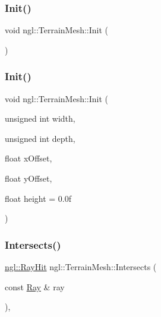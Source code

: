 \mbox{\label{classngl_1_1_terrain_mesh_adcbd87afe29c47b1d1edf5e893dfb95d}} 
\subsubsection{\texorpdfstring{Init()}{Init()}\hspace{0.1cm}{\footnotesize\ttfamily [1/2]}}
{\footnotesize\ttfamily void ngl\+::\+Terrain\+Mesh\+::\+Init (\begin{DoxyParamCaption}{ }\end{DoxyParamCaption})}

\mbox{\label{classngl_1_1_terrain_mesh_a23945d3a6905069b02b95684ef965447}} 
\subsubsection{\texorpdfstring{Init()}{Init()}\hspace{0.1cm}{\footnotesize\ttfamily [2/2]}}
{\footnotesize\ttfamily void ngl\+::\+Terrain\+Mesh\+::\+Init (\begin{DoxyParamCaption}\item[{unsigned int}]{width,  }\item[{unsigned int}]{depth,  }\item[{float}]{x\+Offset,  }\item[{float}]{y\+Offset,  }\item[{float}]{height = {\ttfamily 0.0f} }\end{DoxyParamCaption})}

\mbox{\label{classngl_1_1_terrain_mesh_ace57d898dc60e94330ef4f46e54abe2e}} 
\subsubsection{\texorpdfstring{Intersects()}{Intersects()}}
{\footnotesize\ttfamily \mbox{\hyperlink{classngl_1_1_ray_hit}{ngl\+::\+Ray\+Hit}} ngl\+::\+Terrain\+Mesh\+::\+Intersects (\begin{DoxyParamCaption}\item[{const \mbox{\hyperlink{classngl_1_1_ray}{Ray}} \&}]{ray }\end{DoxyParamCaption})\hspace{0.3cm}{\ttfamily [override]}, {\ttfamily [virtual]}}




